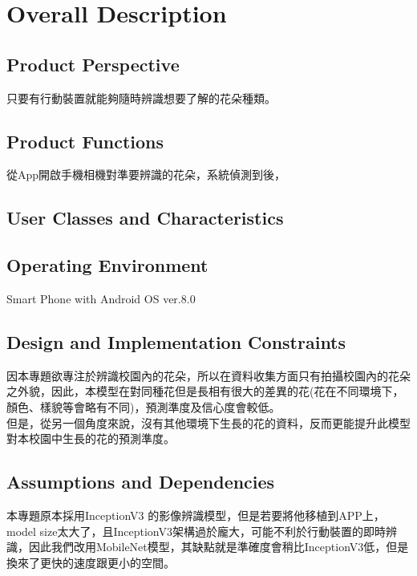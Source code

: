 \documentclass{scrreprt}
\begin{document}
\chapter{Overall Description}

\section{Product Perspective}
\begin{CJK}{UTF8}{bkai}
只要有行動裝置就能夠隨時辨識想要了解的花朵種類。
\end{CJK}

\section{Product Functions}
\begin{CJK}{UTF8}{bkai}
	從App開啟手機相機對準要辨識的花朵，系統偵測到後，
\end{CJK}

\section{User Classes and Characteristics}

\section{Operating Environment}
Smart Phone with Android OS ver.8.0 

\section{Design and Implementation Constraints}
\begin{CJK}{UTF8}{bkai}
	因本專題欲專注於辨識校園內的花朵，所以在資料收集方面只有拍攝校園內的花朵之外貌，因此，本模型在對同種花但是長相有很大的差異的花(花在不同環境下，顏色、樣貌等會略有不同)，預測準度及信心度會較低。 \\
	但是，從另一個角度來說，沒有其他環境下生長的花的資料，反而更能提升此模型對本校園中生長的花的預測準度。
\end{CJK}

\section{Assumptions and Dependencies}
\begin{CJK}{UTF8}{bkai}
	本專題原本採用InceptionV3 的影像辨識模型，但是若要將他移植到APP上，model size太大了，且InceptionV3架構過於龐大，可能不利於行動裝置的即時辨識，因此我們改用MobileNet模型，其缺點就是準確度會稍比InceptionV3低，但是換來了更快的速度跟更小的空間。
\end{CJK}
\end{document}
